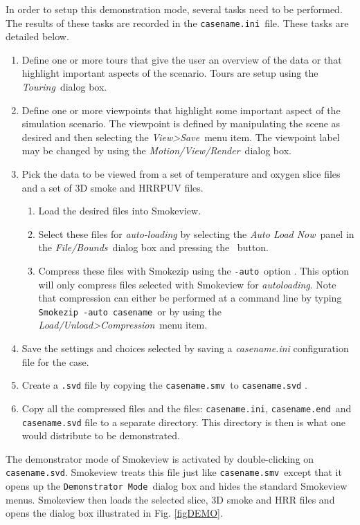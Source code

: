 \documentclass[11pt,twoside]{book}
\newcommand{\frameit}[1]{\fbox{\tt #1}}
\begin{document}
In order to setup this demonstration mode, several tasks need to be performed.
The results of these tasks are
recorded in the {\tt casename.ini}\ file.
These tasks are detailed below.

\begin{enumerate}
  \item Define one or more tours that give the user an overview of the data or that highlight important
  aspects of the scenario.   Tours are setup using the {\em Touring}\ dialog box.
  \item Define one or more viewpoints that highlight some important
  aspect of the simulation scenario.  The viewpoint is defined by manipulating the scene
  as desired and then selecting the {\em View>Save}\ menu item.  The viewpoint label may
  be changed by using the {\em Motion/View/Render}\ dialog box.
  \item Pick the data to be viewed from a set of temperature and oxygen slice files
  and a set of 3D smoke and HRRPUV files.
  \begin{enumerate}
    \item Load the desired files into Smokeview.
    \item Select these files for {\em auto-loading} by selecting the {\em Auto Load Now}\ panel
    in the {\em File/Bounds}\ dialog box and pressing the
    \frameit{Save Auto Load File List}\ button.
    \item Compress these files with Smokezip using the {\tt -auto}\ option .
    This option will only compress files selected with Smokeview for {\em autoloading}.
    Note that compression can either be performed at a command line by typing
    {\tt Smokezip -auto casename}\ or by using the {\em Load/Unload>Compression}\ menu item.
      \end{enumerate}
  \item Save the settings and choices selected by saving a {\em casename.ini}
  configuration file for the case.
  \item Create a {\tt .svd} file by copying the {\tt casename.smv}\ to {\tt casename.svd} .
  \item Copy all the compressed files and the files: {\tt casename.ini}, {\tt casename.end}\ and {\tt casename.svd} file to a separate directory.  This directory is then is what one would distribute to be demonstrated.
\end{enumerate}

The demonstrator mode of Smokeview is activated by double-clicking on {\tt casename.svd}.
Smokeview treats this file just like {\tt casename.smv}\ except that it opens up
the {\tt Demonstrator Mode}\ dialog box and hides the standard Smokeview menus.
Smokeview then
loads the selected slice, 3D smoke and HRR files and opens the dialog box illustrated in
Fig. \ref{figDEMO}.
\end{document}
